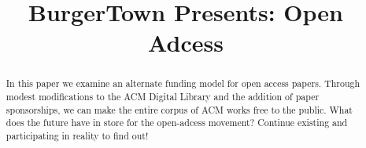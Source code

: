 \documentclass[sigtbd]{sigtbd17-style}
\begin{document}
\title{BurgerTown Presents: Open Adcess}
\maketitle

\begin{abstract}
  In this paper we examine an alternate funding model for open access papers.
  Through modest modifications to the ACM Digital Library and the addition of
  paper sponsorships, we can make the entire corpus of ACM works free to the
  public. What does the future have in store for the open-adcess movement?
  Continue existing and participating in reality to find out!
\end{abstract}













{}

\end{document}
